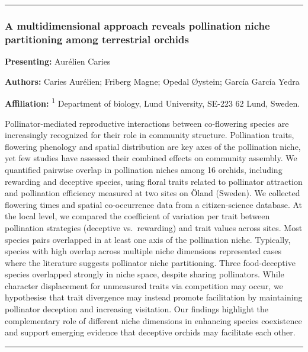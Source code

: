 \documentclass[
  letterpaper,
  DIV=11,
  numbers=noendperiod]{scrartcl}
\begin{document}
\begin{center}\rule{0.5\linewidth}{0.5pt}\end{center}

\subsubsection{A multidimensional approach reveals pollination niche
partitioning among terrestrial
orchids}\label{a-multidimensional-approach-reveals-pollination-niche-partitioning-among-terrestrial-orchids}

\textbf{Presenting:} Aurélien Caries

\textbf{Authors:} Caries Aurélien; Friberg Magne; Opedal Øystein; García
García Yedra

\textbf{Affiliation:} \textsuperscript{1} Department of biology, Lund
University, SE-223 62 Lund, Sweden.

Pollinator-mediated reproductive interactions between co-flowering
species are increasingly recognized for their role in community
structure. Pollination traits, flowering phenology and spatial
distribution are key axes of the pollination niche, yet few studies have
assessed their combined effects on community assembly. We quantified
pairwise overlap in pollination niches among 16 orchids, including
rewarding and deceptive species, using floral traits related to
pollinator attraction and pollination efficiency measured at two sites
on Öland (Sweden). We collected flowering times and spatial
co-occurrence data from a citizen-science database. At the local level,
we compared the coefficient of variation per trait between pollination
strategies (deceptive vs.~rewarding) and trait values across sites. Most
species pairs overlapped in at least one axis of the pollination niche.
Typically, species with high overlap across multiple niche dimensions
represented cases where the literature suggests pollinator niche
partitioning. Three food-deceptive species overlapped strongly in niche
space, despite sharing pollinators. While character displacement for
unmeasured traits via competition may occur, we hypothesise that trait
divergence may instead promote facilitation by maintaining pollinator
deception and increasing visitation. Our findings highlight the
complementary role of different niche dimensions in enhancing species
coexistence and support emerging evidence that deceptive orchids may
facilitate each other.

\begin{center}\rule{0.5\linewidth}{0.5pt}\end{center}
\end{document}
